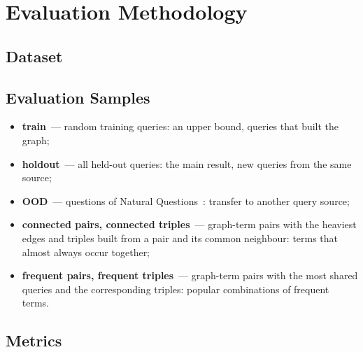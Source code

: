 \documentclass[11pt, a4paper]{article}
\newif\ifdraftnotes
\newcommand{\todo}[1]{\ifdraftnotes\par\noindent{\small\color{red!75!black}\textbf{TODO:} #1}\par\fi}
\begin{document}
\section{Evaluation Methodology}

\subsection{Dataset}

\todo{Text: MS~MARCO v2.1, passage selection and distractors, text normalisation and the analyser shared with the index, the 95/5 query split in dataset order. Materials: Table~\ref{tab:corpus}~--- corpus and graph characteristics.}

\begin{table}[H]
	\caption{Corpus and term-graph characteristics}
	\label{tab:corpus}
	\centering
	\small
	
\end{table}

\subsection{Evaluation Samples}

\todo{Text: what each of the seven samples measures; the synthetic ones depend only on the graph and are shared by all algorithms. Materials: the list below; sample sizes~--- Table~\ref{tab:samples} in Section~5.4.}

\begin{itemize}
	\item \textbf{train}~--- \nTrain{} random training queries: an upper bound, queries that built the graph;
	\item \textbf{holdout}~--- all \nHoldout{} held-out queries: the main result, new queries from the same source;
	\item \textbf{OOD}~--- \nOod{} questions of Natural Questions~\cite{kwiatkowski2019,lee2019}: transfer to another query source;
	\item \textbf{connected pairs, connected triples}~--- \nConnectedPairs{} graph-term pairs with the heaviest edges and triples built from a pair and its common neighbour: terms that almost always occur together;
	\item \textbf{frequent pairs, frequent triples}~--- \nFrequentPairs{} graph-term pairs with the most shared queries and the corresponding triples: popular combinations of frequent terms.
\end{itemize}

\subsection{Metrics}
\end{document}
